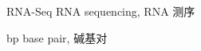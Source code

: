 \begin{denotation}

\item[RNA-Seq] RNA sequencing, RNA 测序

\item[bp] base pair, 碱基对

\end{denotation}

